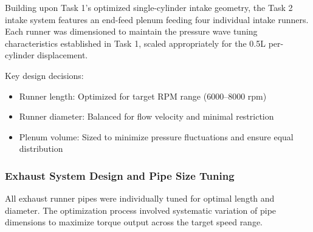 Building upon Task 1's optimized single-cylinder intake geometry, the Task 2 intake system features an end-feed plenum feeding four individual intake runners. Each runner was dimensioned to maintain the pressure wave tuning characteristics established in Task 1, scaled appropriately for the 0.5L per-cylinder displacement.

Key design decisions:
\begin{itemize}
    \item Runner length: Optimized for target RPM range (6000--8000 rpm)
    \item Runner diameter: Balanced for flow velocity and minimal restriction
    \item Plenum volume: Sized to minimize pressure fluctuations and ensure equal distribution
\end{itemize}

\subsubsection{Exhaust System Design and Pipe Size Tuning}

All exhaust runner pipes were individually tuned for optimal length and diameter. The optimization process involved systematic variation of pipe dimensions to maximize torque output across the target speed range.

